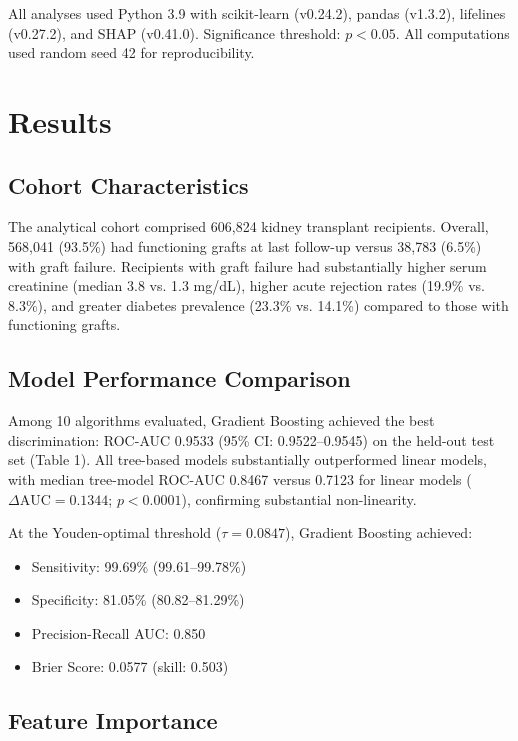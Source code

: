 \documentclass[11pt,a4paper]{article}
\begin{document}
All analyses used Python 3.9 with scikit-learn (v0.24.2), pandas (v1.3.2), lifelines (v0.27.2), and SHAP (v0.41.0). Significance threshold: $p<0.05$. All computations used random seed 42 for reproducibility.

\section{Results}

\subsection{Cohort Characteristics}

The analytical cohort comprised 606,824 kidney transplant recipients. Overall, 568,041 (93.5\%) had functioning grafts at last follow-up versus 38,783 (6.5\%) with graft failure. Recipients with graft failure had substantially higher serum creatinine (median 3.8 vs. 1.3 mg/dL), higher acute rejection rates (19.9\% vs. 8.3\%), and greater diabetes prevalence (23.3\% vs. 14.1\%) compared to those with functioning grafts.

\subsection{Model Performance Comparison}

Among 10 algorithms evaluated, Gradient Boosting achieved the best discrimination: ROC-AUC 0.9533 (95\% CI: 0.9522–0.9545) on the held-out test set (Table 1). All tree-based models substantially outperformed linear models, with median tree-model ROC-AUC 0.8467 versus 0.7123 for linear models ($\Delta\text{AUC}=0.1344$; $p<0.0001$), confirming substantial non-linearity.

At the Youden-optimal threshold ($\tau=0.0847$), Gradient Boosting achieved:
\begin{itemize}
    \item Sensitivity: 99.69\% (99.61–99.78\%)
    \item Specificity: 81.05\% (80.82–81.29\%)
    \item Precision-Recall AUC: 0.850
    \item Brier Score: 0.0577 (skill: 0.503)
\end{itemize}

\subsection{Feature Importance}
\end{document}
